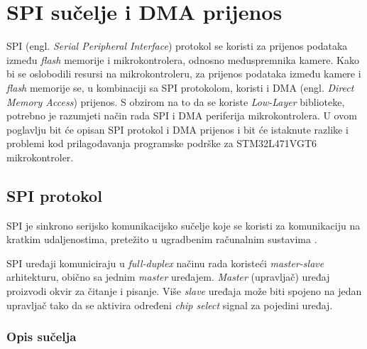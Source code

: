 \chapter{SPI sučelje i DMA prijenos}

SPI (engl. \textit{Serial Peripheral Interface}) protokol se koristi za prijenos podataka između \textit{flash} memorije i mikrokontrolera, odnosno međuspremnika kamere. Kako bi se oslobodili resursi na mikrokontroleru, za prijenos podataka između kamere i \textit{flash} memorije se, u kombinaciji sa SPI protokolom, koristi i DMA (engl. \textit{Direct Memory Access}) prijenos. S obzirom na to da se koriste \textit{Low-Layer} biblioteke, potrebno je razumjeti način rada SPI i DMA periferija mikrokontrolera. U ovom poglavlju bit će opisan SPI protokol i DMA prijenos i bit će istaknute razlike i problemi kod prilagođavanja programske podrške za STM32L471VGT6 mikrokontroler.

\section{SPI protokol}

SPI je sinkrono serijsko komunikacijsko sučelje koje se koristi za komunikaciju na kratkim udaljenostima, pretežito u ugradbenim računalnim sustavima \cite{spi_wikipedia}. 

SPI uređaji komuniciraju u \textit{full-duplex} načinu rada koristeći \textit{master-slave} arhitekturu, obično sa jednim \textit{master} uređajem. \textit{Master} (upravljač) uređaj proizvodi okvir za čitanje i pisanje. Više \textit{slave} uređaja može biti spojeno na jedan upravljač tako da se aktivira određeni \textit{chip select} signal za pojedini uređaj.

\subsection{Opis sučelja}

